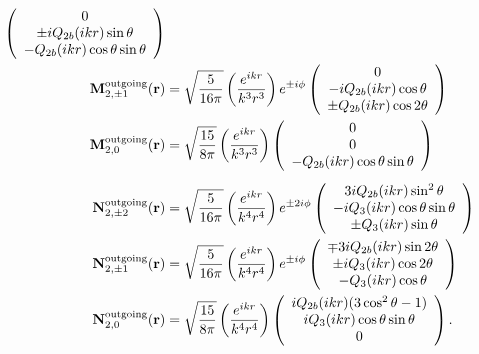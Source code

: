 \documentclass[letterpaper]{article}
\begin{document}
\begin{align*}
    \left(\begin{array}{c}
    0 				  \\
   \pm  iQ_{2b}(ikr)\sin\theta	  \\
    -Q_{2b}(ikr)\cos\theta\sin\theta
    \end{array}\right)
\\
 \mathbf{M}^{\text{\scriptsize outgoing}}_{2,\pm 1}(\mathbf{r})
  &=\sqrt\frac{5}{16\pi}\left(\frac{e^{ikr}}{k^3 r^3}\right) e^{\pm i\phi}
    \left(\begin{array}{c}
    0                            \\
    -iQ_{2b}(ikr)\cos\theta  \\
    \pm Q_{2b}(ikr)\cos 2\theta
    \end{array}\right)
\\
 \mathbf{M}^{\text{\scriptsize outgoing}}_{2,0}(\mathbf{r})
  &=\sqrt\frac{15}{8\pi}\left(\frac{e^{ikr}}{k^3 r^3}\right)
    \left(\begin{array}{c}
    0 \\ 
    0 \\ 
    -Q_{2b}(ikr)\cos \theta \sin\theta
    \end{array}\right)
\\[5pt]
 \mathbf{N}^{\text{\scriptsize outgoing}}_{2,\pm 2}(\mathbf{r})
  &=\sqrt\frac{5}{16\pi}\left(\frac{e^{ikr}}{k^4 r^4}\right) e^{\pm 2i\phi}
    \left(\begin{array}{c}
   3iQ_{2b}(ikr) \sin^2 \theta                          \\
   -iQ_3(ikr) \cos\theta \sin\theta   \\
   \pm Q_3(ikr) \sin\theta 
    \end{array}\right)
\\
 \mathbf{N}^{\text{\scriptsize outgoing}}_{2,\pm 1}(\mathbf{r})
  &=\sqrt\frac{5}{16\pi}\left(\frac{e^{ikr}}{k^4 r^4}\right) e^{\pm i\phi}
    \left(\begin{array}{c}
   \mp 3iQ_{2b}(ikr) \sin 2\theta               \\
   \pm iQ_3(ikr) \cos 2\theta  \\
   -Q_3(ikr) \cos\theta
    \end{array}\right)
\\
 \mathbf{N}^{\text{\scriptsize outgoing}}_{2,0}(\mathbf{r})
  &=\sqrt\frac{15}{8\pi}\left(\frac{e^{ikr}}{k^4 r^4}\right)
    \left(\begin{array}{c}
   iQ_{2b}(ikr)(3\cos^2 \theta -1)                    \\
   iQ_3(ikr) \cos \theta \sin\theta \\
   0
    \end{array}\right).
\end{align*}
\end{document}
